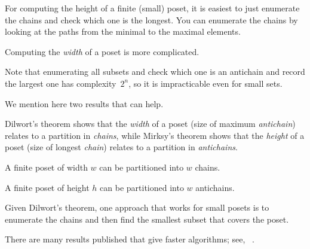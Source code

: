 

\begin{hint}
    For computing the height of a finite (small) poset, it is easiest to just enumerate the chains and check which one is the longest.
    You can enumerate the chains by looking at the paths from the minimal to the maximal elements.
\end{hint}

\begin{hint}
    Computing the \emph{width} of a poset is more complicated.

    Note that enumerating all subsets and check which one is an antichain and record the largest one has complexity~$2^n$, so it is impracticable even for small sets.

    We mention here two results that can help.

    Dilwort's theorem shows that the \emph{width} of a poset (size of maximum \emph{antichain}) relates to a partition in \emph{chains}, while Mirksy's theorem shows that the \emph{height} of a poset (size of longest \emph{chain}) relates to a partition in \emph{antichains}.

    \begin{theorem}
        \label{thm:dilwort}
        A finite poset of width $w$ can be partitioned into $w$ chains.
    \end{theorem}

    \begin{theorem}
        \label{thm:mirsky}
        A finite poset of height $h$ can be partitioned into $w$ antichains.
    \end{theorem}

    Given Dilwort's theorem, one approach that works for small posets is to enumerate the chains and then find the smallest subset that covers the poset.

    There are many results published that give faster algorithms; see, \eg~\cite{chen12decomposition}.

\end{hint}

